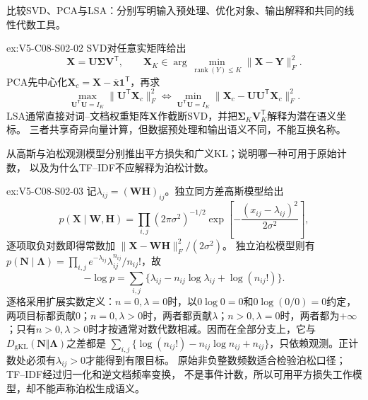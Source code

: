 \begin{SLChapterExercisePairSection}
\begin{exercise}\label{ex:V5-C08-S02-02}
比较SVD、PCA与LSA：分别写明输入预处理、优化对象、输出解释和共同的线性代数工具。
\end{exercise}
\label{sol:V5-C08-S02-02}
\begin{chapterexercisesolution}{ex:V5-C08-S02-02}
SVD对任意实矩阵给出
\[
\boldsymbol X=\boldsymbol U\boldsymbol\Sigma\boldsymbol V^{\mathsf T},
\qquad
\boldsymbol X_K\in\arg\min_{\operatorname{rank}(Y)\le K}
\|\boldsymbol X-\boldsymbol Y\|_F^2.
\]
PCA先中心化$\boldsymbol X_c=\boldsymbol X-\overline{\boldsymbol x}\boldsymbol1^{\mathsf T}$，再求
\[
\max_{\boldsymbol U^{\mathsf T}\boldsymbol U=I_K}
\|\boldsymbol U^{\mathsf T}\boldsymbol X_c\|_F^2
\Longleftrightarrow
\min_{\boldsymbol U^{\mathsf T}\boldsymbol U=I_K}
\|\boldsymbol X_c-\boldsymbol U\boldsymbol U^{\mathsf T}\boldsymbol X_c\|_F^2.
\]
LSA通常直接对词--文档权重矩阵$\boldsymbol X$作截断SVD，并把$\boldsymbol\Sigma_K\boldsymbol V_K^{\mathsf T}$解释为潜在语义坐标。
三者共享奇异向量计算，但数据预处理和输出语义不同，不能互换名称。
\end{chapterexercisesolution}

\begin{exercise}\label{ex:V5-C08-S02-03}
从高斯与泊松观测模型分别推出平方损失和广义KL；说明哪一种可用于原始计数，
以及为什么TF--IDF不应解释为泊松计数。
\end{exercise}
\label{sol:V5-C08-S02-03}
\begin{chapterexercisesolution}{ex:V5-C08-S02-03}
记$\lambda_{ij}=(\boldsymbol W\boldsymbol H)_{ij}$。独立同方差高斯模型给出
\[
p(\boldsymbol X\mid\boldsymbol W,\boldsymbol H)
=\prod_{i,j}(2\pi\sigma^2)^{-1/2}
\exp\!\left[-\frac{(x_{ij}-\lambda_{ij})^2}{2\sigma^2}\right],
\]
逐项取负对数即得常数加
$\|\boldsymbol X-\boldsymbol W\boldsymbol H\|_F^2/(2\sigma^2)$。
独立泊松模型则有
$p(\boldsymbol N\mid\boldsymbol\Lambda)=\prod_{i,j}e^{-\lambda_{ij}}\lambda_{ij}^{n_{ij}}/n_{ij}!$，故
\[
-\log p=\sum_{i,j}\{\lambda_{ij}-n_{ij}\log\lambda_{ij}+\log(n_{ij}!)\}.
\]
逐格采用扩展实数定义：$n=0,\lambda=0$时，以$0\log0=0$和$0\log(0/0)=0$约定，两项目标都贡献$0$；$n=0,\lambda>0$时，两者都贡献$\lambda$；$n>0,\lambda=0$时，两者都为$+\infty$；只有$n>0,\lambda>0$时才按通常对数代数相减。因而在全部分支上，它与$D_{\mathrm{gKL}}(\boldsymbol N\Vert\boldsymbol\Lambda)$之差都是
$\sum_{i,j}\{\log(n_{ij}!)-n_{ij}\log n_{ij}+n_{ij}\}$，只依赖观测。正计数处必须有$\lambda_{ij}>0$才能得到有限目标。
原始非负整数频数适合检验泊松口径；TF--IDF经过归一化和逆文档频率变换，
不是事件计数，所以可用平方损失工作模型，却不能声称泊松生成语义。
\end{chapterexercisesolution}


\end{SLChapterExercisePairSection}
